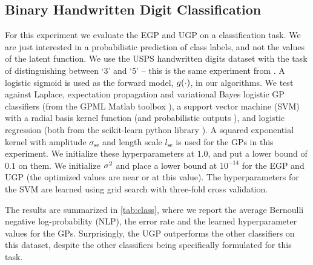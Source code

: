 \documentclass{article} %
\begin{document}
\subsection{Binary Handwritten Digit Classification}

For this experiment we evaluate the EGP and UGP on a classification task. We
are just interested in a probabilistic prediction of class labels, and not the
values of the latent function. We use the USPS handwritten digits dataset with
the task of distinguishing between `3' and `5' -- this is the same experiment
from \cite[\S 3.7.3]{Rasmussen2006}. A logistic sigmoid is used as the forward
model, $g\!\left({{\cdot}}\right)$, in our algorithms. We test against Laplace,
expectation propagation and variational Bayes logistic GP classifiers (from the
GPML Matlab toolbox \cite{Rasmussen2006}), a support vector machine (SVM) with
a radial basis kernel function (and probabilistic outputs \cite{Platt1999}),
and logistic regression (both from the scikit-learn python library
\cite{scikit-learn}). A squared exponential kernel with amplitude
$\sigma_\text{se}$ and length scale $l_\text{se}$ is used for the GPs in this
experiment. We initialize these hyperparameters at $1.0$, and put a lower bound
of $0.1$ on them. We initialize $\sigma^2$ and place a lower bound at $10^{-14}$
for the EGP and UGP (the optimized values are near or at this value). The
hyperparameters for the SVM are learned using grid search with three-fold cross
validation. 
%

The results are summarized in \autoref{tab:class}, where we report the average
Bernoulli negative log-probability (NLP), the error rate and the learned
hyperparameter values for the GPs. Surprisingly, the UGP outperforms the other
classifiers on this dataset, despite the other classifiers being specifically
formulated for this task. 
\end{document}
